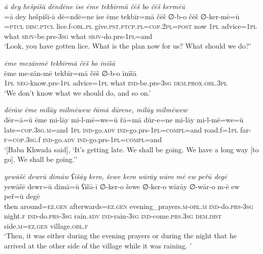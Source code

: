 \ea \label{BP.156}
\textit{ā dey hešpišā dēndēne īse ēme tekbīrmā čēš bo čēš kermēū} \\ 
\gll =ā dey hešpišī-ā dē=ndē=ne īse ēme tekbīr=mā čēš ∅-b-o čēš ∅-ker-mē=ū \\ 
=\textsc{ptcl} \textsc{disc.ptcl} lice.f\textsc{-obl}\textsc{.pl} give\textsc{.pst}\textsc{.ptcp}\textsc{.pl}\textsc{=cop}.\textsc{2pl}\textsc{=\textsc{post}} now \textsc{1pl} advice\textsc{=\textsc{1pl}} what \textsc{sbjv-}be.prs\textsc{-3sg} what \textsc{sbjv-}do.prs\textsc{-\textsc{1pl}}=and \\ 
\glt `Look, you have gotten lice. What is the plan now for us? What should we do?'
\z 
 
\ea \label{BP.157}
\textit{ēme mezānmē tekbīrmā čēš bo īnīšā} \\ 
\gll ēme me-zān-mē tekbīr=mā čēš ∅-b-o īnīšā \\ 
 \textsc{1pl} \textsc{neg-}know.prs\textsc{-\textsc{1pl}} advice\textsc{=\textsc{1pl}} what \textsc{ind-}be.prs\textsc{-3sg} \textsc{dem.prox}\textsc{.obl}\textsc{.3pl} \\ 
\glt `We don’t know what we should do, and so on.'
\z 
 
\ea \label{BP.191}
\textit{dērāw ēme milāy milmēwew řāmā dūrene, milāy milmēwew} \\ 
\gll dēr=ā=ū ēme mi-lāy mi-l-mē=we=ū řā=mā dūr-e=ne mi-lāy mi-l-mē=we=ū \\ 
 late\textsc{=cop}\textsc{.3sg}\textsc{.m}=and \textsc{1pl} \textsc{ind-}go\textsc{.adv} \textsc{ind-}go.prs\textsc{-\textsc{1pl}}\textsc{=compl}=and road.f\textsc{=\textsc{1pl}} far\textsc{-f}\textsc{=cop}\textsc{.3sg}.f \textsc{ind-}go\textsc{.adv} \textsc{ind-}go.prs\textsc{-\textsc{1pl}}\textsc{=compl}=and \\ 
\glt `[Baba Khwada said], ‘It’s getting late. We shall be going. We have a long way [to go]. We shall be going.’'
\z 
 
\ea \label{KŠ.59}
\textit{yewāšē dewrū dimāw ʕīšāy kero, šewe kero wārāy wāro mē ew peřū degē} \\ 
\gll yewāšē dewr=ū dimā=ū ʕīšā-ī ∅-ker-o šewe ∅-ker-o wārāy ∅-wār-o m-ē ew peř=ū degē \\ 
 then around\textsc{\textsc{=ez.gen}} afterwards\textsc{\textsc{=ez.gen}} evening\_prayers\textsc{.m}\textsc{-obl}\textsc{.m} \textsc{ind-}do\textsc{.prs}\textsc{-3sg} night\textsc{.f} \textsc{ind-}do\textsc{.prs}\textsc{-3sg} rain\textsc{.adv} \textsc{ind-}rain\textsc{-3sg} \textsc{ind-}come\textsc{.prs}\textsc{.3sg} \textsc{dem.dist} side\textsc{.m}\textsc{\textsc{=ez.gen}} village\textsc{.obl}\textsc{.f} \\ 
\glt `Then, it was either during the evening prayers or during the night that he arrived at the other side of the village while it was raining. '
\z 
 
